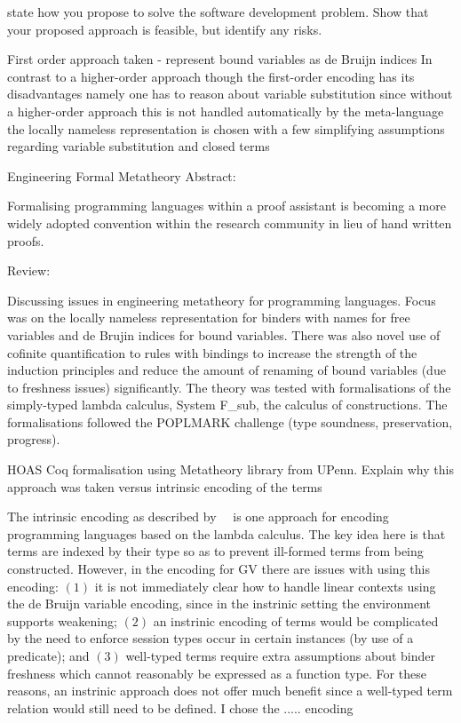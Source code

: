\documentclass{mprop}
\begin{document}
state how you propose to solve the software development problem. Show that
your proposed approach is feasible, but identify any risks.

First order approach taken - represent bound variables as de Bruijn indices
In contrast to a higher-order approach
though the first-order encoding has its disadvantages namely one has to reason about variable substitution since without a higher-order approach this is not handled automatically by the meta-language
the locally nameless representation is chosen with a few simplifying assumptions regarding variable substitution and closed terms

Engineering Formal Metatheory
Abstract:

Formalising programming languages within a proof assistant is becoming a
more widely adopted convention within the research community in lieu of hand
written proofs.

Review:

Discussing issues in engineering metatheory for programming languages.
Focus was on the locally nameless representation for binders with names
for free variables and de Brujin indices for bound variables. There was
also novel use of cofinite quantification to rules with bindings to increase
the strength of the induction principles and reduce the amount of renaming
of bound variables (due to freshness issues) significantly. The theory was
tested with formalisations of the simply-typed lambda calculus, System F_sub,
the calculus of constructions. The formalisations followed the POPLMARK
challenge (type soundness, preservation, progress).


HOAS Coq formalisation using Metatheory library from UPenn.
Explain why this approach was taken versus intrinsic encoding of the terms

The intrinsic encoding as described by~\citeauthor{Benton:2012:STT}~\cite{Benton:2012:STT} is one approach for encoding programming languages based on the lambda calculus. The key idea here is that terms are indexed by their type so as to prevent ill-formed terms from being constructed. However, in the encoding for GV there are issues with using this encoding: $(1)$ it is not immediately clear how to handle linear contexts using the de Bruijn variable encoding, since in the instrinic setting the environment supports weakening; $(2)$ an instrinic encoding of terms would be complicated by the need to enforce session types occur in certain instances (by use of a predicate); and $(3)$ well-typed terms require extra assumptions about binder freshness which cannot reasonably be expressed as a function type. For these reasons, an instrinic approach does not offer much benefit since a well-typed term relation would still need to be defined. I chose the ..... encoding
\end{document}
